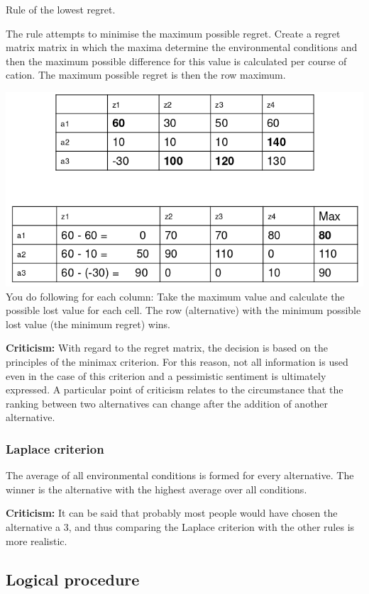 Rule of the lowest regret.

The rule attempts to minimise the maximum possible regret. Create a
regret matrix matrix in which the maxima determine the environmental
conditions and then the maximum possible difference for this value is
calculated per course of cation. The maximum possible regret is then the
row maximum.

\includegraphics{figures/savage-niehansRule.png} You do following for
each column: Take the maximum value and calculate the possible lost
value for each cell. The row (alternative) with the minimum possible
lost value (the minimum regret) wins.

\textbf{Criticism:} With regard to the regret matrix, the decision is
based on the principles of the minimax criterion. For this reason, not
all information is used even in the case of this criterion and a
pessimistic sentiment is ultimately expressed. A particular point of
criticism relates to the circumstance that the ranking between two
alternatives can change after the addition of another alternative.

\hypertarget{laplace-criterion}{%
\subsubsection{Laplace criterion}\label{laplace-criterion}}

The average of all environmental conditions is formed for every
alternative. The winner is the alternative with the highest average over
all conditions.

\textbf{Criticism:} It can be said that probably most people would have
chosen the alternative a 3, and thus comparing the Laplace criterion
with the other rules is more realistic.

\hypertarget{logical-procedure}{%
\subsection{Logical procedure}\label{logical-procedure}}

